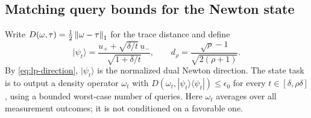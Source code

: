 \subsection{Matching query bounds for the Newton state}
Write $D(\omega,\tau)=\tfrac12\left\lVert\omega-\tau\right\rVert_1$ for the trace distance and define
\begin{equation}\label{eq:lp-target}
 |\psi_t\rangle=
 \frac{u_++\sqrt{\delta/t}\,u_-}{\sqrt{1+\delta/t}},\qquad
 d_\rho=\frac{\sqrt\rho-1}{\sqrt{2(\rho+1)}}.
\end{equation}
By \eqref{eq:lp-direction}, $|\psi_t\rangle$ is the normalized dual Newton direction. The state task is to output a density operator $\omega_t$ with
$D(\omega_t,|\psi_t\rangle\langle\psi_t|)\leq\epsilon_0$ for every $t\in[\delta,\rho\delta]$, using a bounded worst-case number of queries. Here $\omega_t$ averages over all measurement outcomes; it is not conditioned on a favorable one.

